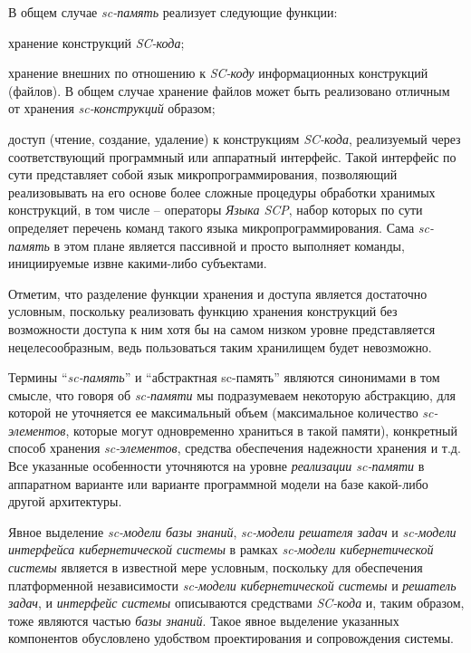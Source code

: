 В общем случае \textit{sc-память} реализует следующие функции:
\begin{textitemize}
	\item хранение конструкций \textit{SC-кода};
	\item хранение внешних по отношению к \textit{SC-коду} информационных конструкций (файлов). В общем случае хранение файлов может быть реализовано отличным от хранения \textit{sc-конструкций} образом;	
	\item доступ (чтение, создание, удаление) к конструкциям \textit{SC-кода}, реализуемый через соответствующий программный или аппаратный интерфейс. Такой интерфейс по сути представляет собой язык микропрограммирования, позволяющий реализовывать на его основе более сложные процедуры обработки хранимых конструкций, в том числе -- операторы \textit{Языка SCP}, набор которых по сути определяет перечень команд такого языка микропрограммирования. Сама \textit{sc-память} в этом плане является пассивной и просто выполняет команды, инициируемые извне какими-либо субъектами.
\end{textitemize}	

Отметим, что разделение функции хранения и доступа является достаточно условным, поскольку реализовать функцию хранения конструкций без возможности доступа к ним хотя бы на самом низком уровне представляется нецелесообразным, ведь пользоваться таким хранилищем будет невозможно.

Термины ``\textit{sc-память}'' и ``абстрактная sc-память'' являются синонимами в том смысле, что говоря об \textit{sc-памяти} мы подразумеваем некоторую абстракцию, для которой не уточняется ее максимальный объем (максимальное количество \textit{sc-элементов}, которые могут одновременно храниться в такой памяти), конкретный способ хранения \textit{sc-элементов}, средства обеспечения надежности хранения и т.д. Все указанные особенности уточняются на уровне \textit{реализации sc-памяти} в аппаратном варианте или варианте программной модели на базе какой-либо другой архитектуры.

Явное выделение \textit{sc-модели базы знаний}, \textit{sc-модели решателя задач} и \textit{sc-модели интерфейса кибернетической системы} в рамках \textit{sc-модели кибернетической системы} является в известной мере условным, поскольку для обеспечения платформенной независимости \textit{sc-модели кибернетической системы} и \textit{решатель задач}, и \textit{интерфейс системы} описываются средствами \textit{SC-кода} и, таким образом, тоже являются частью \textit{базы знаний}. Такое явное выделение указанных компонентов обусловлено удобством проектирования и сопровождения системы.

